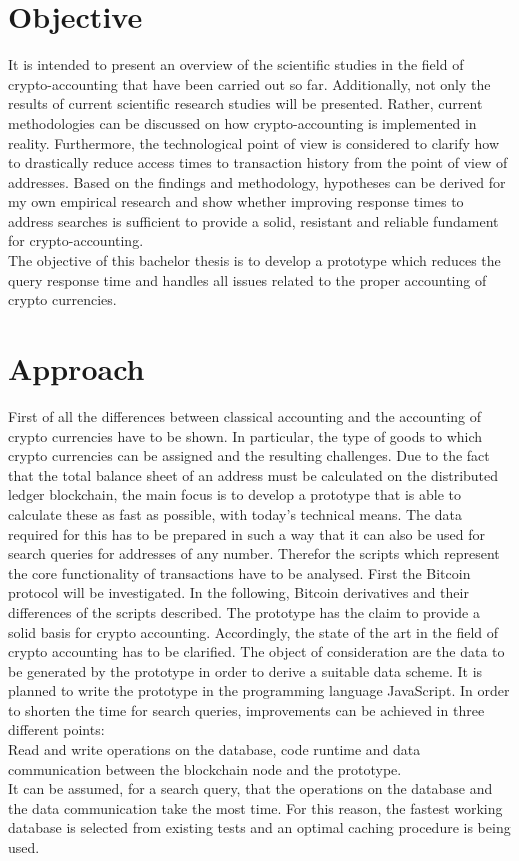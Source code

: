 \documentclass[10pt,journal]{IEEEtran}
\begin{document}
\section{Objective}

It is intended to present an overview of the scientific studies in the field of crypto-accounting that have been carried out so far.
Additionally, not only the results of current scientific research studies will be presented. Rather, current methodologies can be discussed on how crypto-accounting is implemented in reality.
Furthermore, the technological point of view is considered to clarify how to drastically reduce access times to transaction history from the point of view of addresses.
Based on the findings and methodology, hypotheses can be derived for my own empirical research and show whether improving response times to address searches is sufficient to provide a solid, resistant and reliable fundament for crypto-accounting. \\
The objective of this bachelor thesis is to develop a prototype which reduces the query response time and handles all issues related to the proper accounting of crypto currencies.
\section{Approach}

First of all the differences between classical accounting and the accounting of crypto currencies have to be shown. In particular, the type of goods to which crypto currencies can be assigned and the resulting challenges. Due to the fact that the total balance sheet of an address must be calculated on the distributed ledger blockchain, the main focus is to develop a prototype that is able to calculate these as fast as possible, with today's technical means. The data required for this has to be prepared in such a way that it can also be used for search queries for addresses of any number. Therefor the scripts which represent the core functionality of transactions have to be analysed. First the Bitcoin protocol will be investigated. In the following, Bitcoin derivatives and their differences of the scripts described. The prototype has the claim to provide a solid basis for crypto accounting. Accordingly, the state of the art in the field of crypto accounting has to be clarified. The object of consideration are the data to be generated by the prototype in order to derive a suitable data scheme. It is planned to write the prototype in the programming language JavaScript. 
In order to shorten the time for search queries, improvements can be achieved in three different points:\\
Read and write operations on the database, code runtime and data communication between the blockchain node and the prototype. \\
It can be assumed, for a search query, that the operations on the database and the data communication take the most time. For this reason, the fastest working database is selected from existing tests and an optimal caching procedure is being used. 
\noindent
\nocite{*}

\end{document}
